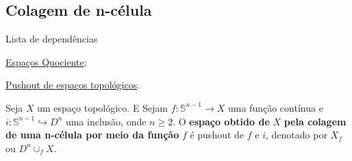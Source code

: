 \subsection{Colagem de n-célula} %
\label{colagem-de-n-celula-def}
\begin{titlemize}{Lista de dependências}
	\item \hyperref[topologia-quociente-def]{Espaços Quociente};\\
    \item \hyperref[pushout-de-espacos-topologicos-def]{Pushout de espaços topológicos}.%
\end{titlemize}

\begin{defi}
    Seja $X$ um espaço topológico. E Sejam $f:\mathbb{S}^{n-1}\rightarrow X$ uma função contínua e $i:\mathbb{S}^{n-1}\hookrightarrow D^n$ uma inclusão, onde $n\ge 2$. O \textbf{espaço obtido de} $X$ \textbf{pela colagem de uma n-célula por meio da função } $f$ é pushout de $f$ e $i$, denotado por $X_f$ ou $D^n\cup_f X$.
\end{defi}

